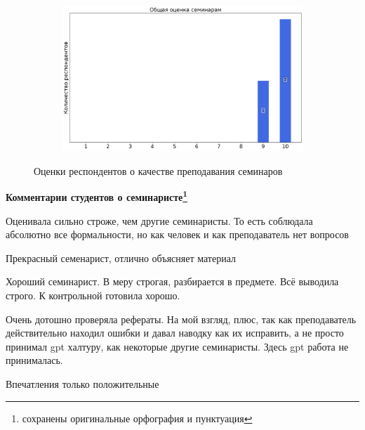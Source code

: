 \begin{figure}[H]
\begin{subfigure}[b]{0.45\textwidth}
			\end{subfigure}
			\begin{subfigure}[b]{0.45\textwidth}
				\centering
				\includegraphics[width=\textwidth]{images/4 course/Защита информации/seminarists-marks-Мозолина Н.В.-3.png}
			\end{subfigure}	
			\caption{Оценки респондентов о качестве преподавания семинаров}
		\end{figure}

		\textbf{Комментарии студентов о семинаристе\protect\footnote{сохранены оригинальные орфография и пунктуация}}
            \begin{commentbox} 
                Оценивала сильно строже, чем другие семинаристы. То есть соблюдала абсолютно все формальности, но как человек и как преподаватель нет вопросов 
            \end{commentbox} 
        
            \begin{commentbox} 
                Прекрасный семенарист, отлично объясняет материал 
            \end{commentbox} 
        
            \begin{commentbox} 
                Хороший семинарист. В меру строгая, разбирается в предмете. Всё выводила строго. К контрольной готовила хорошо. 
        
                Очень дотошно проверяла рефераты. На мой взгляд, плюс, так как преподаватель действительно находил ошибки и давал наводку как их исправить, а не просто принимал gpt халтуру, как  некоторые другие семинаристы. Здесь gpt работа не принималась.
        
                Впечатления только положительные  
            \end{commentbox}


